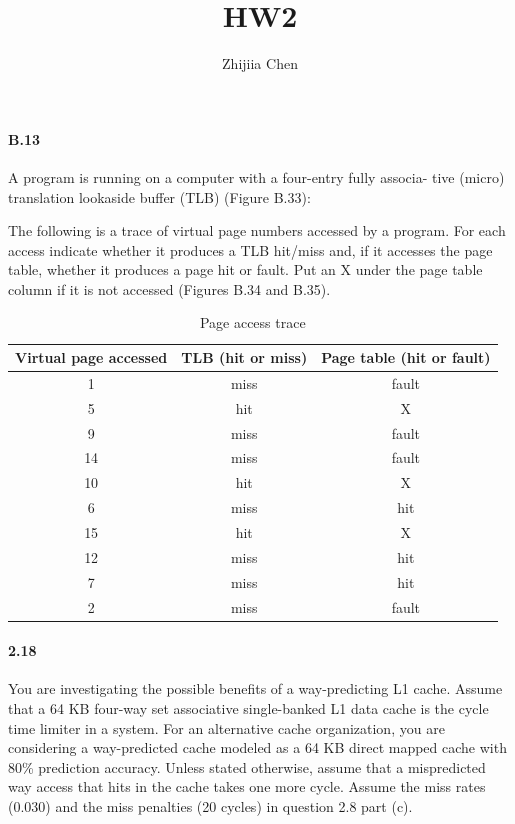 \documentclass{article}
\title{HW2}
\author{Zhijiia Chen}
\begin{document}
\maketitle

\paragraph{B.13} A program is running on a computer with a four-entry fully associa- tive (micro) translation lookaside buffer (TLB) (Figure B.33):

The following is a trace of virtual page numbers accessed by a program. For each access indicate whether it produces a TLB hit/miss and, if it accesses the page table, whether it produces a page hit or fault. Put an X under the page table column if it is not accessed (Figures B.34 and B.35).

\begin{table}[h!]
\begin{center}
    \caption{Page access trace}
    \label{tab:table1}
    \begin{tabular}{c|c|c} %
    \toprule
    \textbf{Virtual page accessed} & \textbf{TLB (hit or miss)} & \textbf{Page table (hit or fault)}\\
    \hline
    1 & miss & fault\\
    \hline
    5 & hit & X\\
    \hline
    9 & miss & fault\\
    \hline
    14 & miss & fault\\
    \hline
    10 & hit & X\\
    \hline
    6 & miss & hit\\
    \hline
    15 & hit & X\\
    \hline
    12 & miss & hit\\
    \hline
    7 & miss & hit\\
    \hline
    2 & miss & fault\\
    \bottomrule
    \end{tabular}
\end{center}
\end{table}

\paragraph{2.18} You are investigating the possible benefits of a way-predicting L1 cache. Assume that a 64 KB four-way set associative single-banked L1 data cache is the cycle time limiter in a system. For an alternative cache organization, you are considering a way-predicted cache modeled as a 64 KB direct mapped cache with 80\% prediction accuracy. Unless stated otherwise, assume that a mispredicted way access that hits in the cache takes one more cycle. Assume the miss rates (0.030) and the miss penalties (20 cycles) in question 2.8 part (c).
\end{document}
